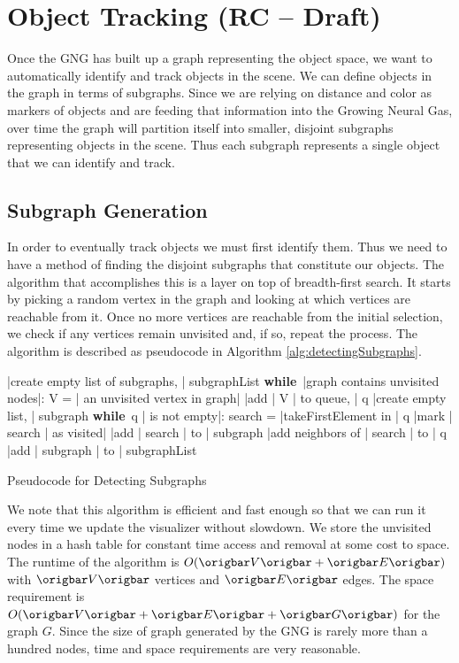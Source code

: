 \documentclass{article}
\renewcommand{\|}{\origbar} %
\renewcommand{\WHILE}{\mbox{{\bf while} }\tab}
\begin{document}
\section{Object Tracking (RC -- Draft)}

Once the GNG has built up a graph representing the object space, we want to automatically identify and track objects in the scene. We can define objects in the graph in terms of subgraphs. Since we are relying on distance and color as markers of objects and are feeding that information into the Growing Neural Gas, over time the graph will partition itself into smaller, disjoint subgraphs representing objects in the scene. Thus each subgraph represents a single object that we can identify and track.

\subsection{Subgraph Generation}

In order to eventually track objects we must first identify them. Thus we need to have a method of finding the disjoint subgraphs that constitute our objects. The algorithm that accomplishes this is a layer on top of breadth-first search. It starts by picking a random vertex in the graph and looking at which vertices are reachable from it. Once no more vertices are reachable from the initial selection, we check if any vertices remain unvisited and, if so, repeat the process. The algorithm is described as pseudocode in Algorithm \ref{alg:detectingSubgraphs}.

\begin{Algorithm}[h!]
\begin{program}
  |create empty list of subgraphs, | subgraphList 
  \WHILE |graph contains unvisited nodes|:
    V = | an unvisited vertex in graph|
    |add | V | to queue, | q
    |create empty list, | subgraph 
    \WHILE q | is not empty|:
      search = |takeFirstElement in | q 
      |mark | search | as visited|
      |add | search | to | subgraph
      |add neighbors of | search | to | q \untab
  |add | subgraph | to | subgraphList
\end{program}
\caption{Pseudocode for Detecting Subgraphs}
\label{alg:detectingSubgraphs}
\end{Algorithm}

We note that this algorithm is efficient and fast enough so that we can run it every time we update the visualizer without slowdown. We store the unvisited nodes in a hash table for constant time access and removal at some cost to space. The runtime of the algorithm is $O(\|V\|+\|E\|)$ with $\|V\|$ vertices and $\|E\|$ edges. The space requirement is $O(\|V\|+\|E\|+\|G\|)$ for the graph $G$. Since the size of graph generated by the GNG is rarely more than a hundred nodes, time and space requirements are very reasonable.
\end{document}
